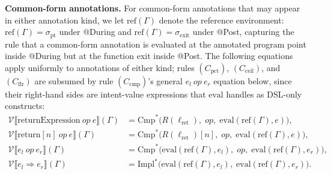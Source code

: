 \documentclass[pdflatex,sn-basic]{sn-jnl}%
\theoremstyle{thmstyleone}%
\theoremstyle{thmstyletwo}%
\theoremstyle{thmstylethree}%
\begin{document}
\smallskip
\textbf{Common-form annotations.}
For common-form annotations that may appear in either annotation kind, we let $\text{ref}(\Gamma)$ denote the reference environment: $\text{ref}(\Gamma) = \sigma_{\text{pt}}$ under @During and $\text{ref}(\Gamma) = \sigma_{\text{exit}}$ under @Post, capturing the rule that a common-form annotation is evaluated at the annotated program point inside @During but at the function exit inside @Post.
The following equations apply uniformly to annotations of either kind; rules $(C_{\text{pct}})$, $(C_{\text{ceil}})$, and $(C_{\text{flr}})$ are subsumed by rule $(C_{\text{cmp}})$'s general $e_l\ \mathit{op}\ e_r$ equation below, since their right-hand sides are intent-value expressions that $\text{eval}$ handles as DSL-only constructs:
\begin{align*}
\mathcal{V}\llbracket \text{returnExpression}\ \mathit{op}\ e \rrbracket(\Gamma)
    &= \text{Cmp}^*\bigl(R(\ell_{\text{ret}}),\; \mathit{op},\; \text{eval}(\text{ref}(\Gamma), e)\bigr), \\[3pt]
\mathcal{V}\llbracket \text{return}[n]\ \mathit{op}\ e \rrbracket(\Gamma)
    &= \text{Cmp}^*\bigl(R(\ell_{\text{ret}})[n],\; \mathit{op},\; \text{eval}(\text{ref}(\Gamma), e)\bigr), \\[3pt]
\mathcal{V}\llbracket e_l\ \mathit{op}\ e_r \rrbracket(\Gamma)
    &= \text{Cmp}^*\bigl(\text{eval}(\text{ref}(\Gamma), e_l),\; \mathit{op},\; \text{eval}(\text{ref}(\Gamma), e_r)\bigr), \\[3pt]
\mathcal{V}\llbracket e_l \Rightarrow e_r \rrbracket(\Gamma)
    &= \text{Impl}^*\bigl(\text{eval}(\text{ref}(\Gamma), e_l),\; \text{eval}(\text{ref}(\Gamma), e_r)\bigr).
\end{align*}
\end{document}
